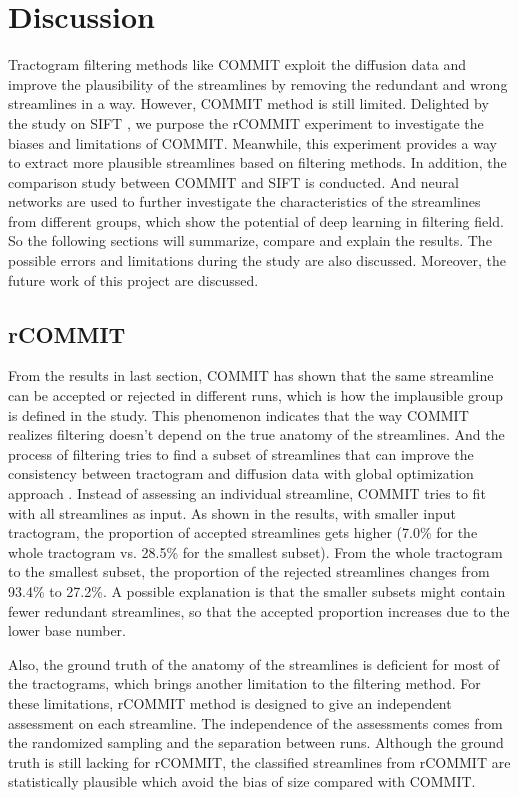 \chapter{Discussion}
Tractogram filtering methods like COMMIT exploit the diffusion data and improve the plausibility of 
the streamlines by removing the redundant and wrong streamlines in a way. 
However, COMMIT method is still limited. Delighted by the study on SIFT \cite{hainAssessingStreamlinePlausibility2022}, 
we purpose the rCOMMIT experiment to 
investigate the biases and limitations of COMMIT. Meanwhile, this experiment provides a way 
to extract more plausible streamlines based on filtering methods. 
In addition, the comparison study between COMMIT and SIFT is conducted. 
And neural networks are used to further investigate the characteristics of the streamlines from 
different groups, which show the potential of deep learning in filtering field. 
So the following sections will summarize, compare and explain the results. 
The possible errors and limitations during 
the study are also discussed. Moreover, the future work of this project are discussed.

\section{rCOMMIT}
From the results in last section, COMMIT has shown that the same streamline can be accepted or rejected in different runs, which is 
how the implausible group is defined in the study. This phenomenon indicates that the way COMMIT realizes filtering doesn't depend
on the true anatomy of the streamlines. And the process of filtering tries to find a subset of streamlines that can improve 
the consistency between tractogram and diffusion data with global optimization approach \cite{hainAssessingStreamlinePlausibility2022}.
Instead of assessing an individual streamline, COMMIT tries to fit with all streamlines as input. 
As shown in the results, with smaller input tractogram, the proportion of accepted streamlines gets higher 
(7.0\% for the whole tractogram vs. 28.5\% for the smallest subset). From the whole tractogram to the smallest subset, the proportion of 
the rejected streamlines changes from  93.4\% to 27.2\%. 
A possible explanation is that the smaller subsets might contain fewer redundant streamlines, so that the accepted proportion increases
due to the lower base number. 

Also, the ground truth of the anatomy of the streamlines is deficient for most of the tractograms, 
which brings another limitation to the filtering method. For these limitations, rCOMMIT method is designed to give an independent
assessment on each streamline. The independence of the assessments comes from the randomized sampling and the separation between runs.  
Although the ground truth is still lacking for rCOMMIT, the classified streamlines from rCOMMIT are statistically plausible which avoid 
the bias of size compared with COMMIT. 

